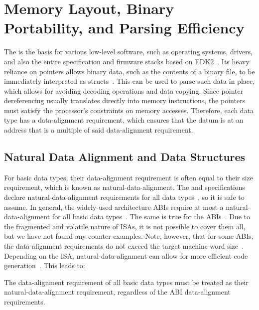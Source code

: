 \section{Memory Layout, Binary Portability, and Parsing Efficiency}
\label{sec:parsing}

The  is the basis for various low-level software, such as operating systems, drivers, and also the entire  specification and \gls{firmware} stacks based on \gls{EDK2}~\cite{uefi-spec,linux,edk2}. Its heavy reliance on pointers allows binary data, such as the contents of a binary file, to be immediately interpreted as structs~\cite{ISO:2018:III}. This can be used to parse such data in place, which allows for avoiding decoding operations and data copying. Since pointer dereferencing usually translates directly into memory instructions, the pointers must satisfy the processor's constraints on memory accesses. Therefore, each  data type has a \gls{data-alignment} requirement, which ensures that the datum is at an address that is a multiple of said \gls{data-alignment} requirement.

\subsection{Natural Data Alignment and Data Structures}

For basic data types, their \gls{data-alignment} requirement is often equal to their size requirement, which is known as \gls{natural-data-alignment}. The  and  specifications declare \gls{natural-data-alignment} requirements for all data types~\cite{pi-spec,uefi-spec}, so it is safe to assume. In general, the widely-used  architecture \glspl{ABI} require at most a \gls{natural-data-alignment} for all basic data types~\cite{agner-x86-cc}. The same is true for the  \glspl{ABI}~\cite{arm32-pcs,arm64-pcs}. Due to the fragmented and volatile nature of \glspl{ISA}, it is not possible to cover them all, but we have not found any counter-examples. Note, however, that for some \glspl{ABI}, the \gls{data-alignment} requirements do not exceed the target \gls{machine-word} size~\cite{sysVi386,arm32-pcs}. Depending on the \gls{ISA}, \gls{natural-data-alignment} can allow for more efficient code generation~\cite{arm-nataligned}. This leads to:

\begin{requirement}
  \label{req:nat_align}
  The \gls{data-alignment} requirement of all basic data types must be treated as their \gls{natural-data-alignment} requirement, regardless of the \gls{ABI} \gls{data-alignment} requirements.
\end{requirement}

